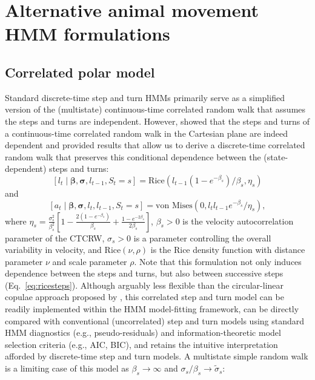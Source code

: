 \documentclass[12pt]{article}\usepackage[]{graphicx}\usepackage[]{xcolor}
\begin{document}
\section{Alternative animal movement HMM formulations}

\subsection{Correlated polar model}
Standard discrete-time step and turn HMMs primarily serve as a simplified version of the (multistate) continuous-time correlated random walk \citep[CTCRW, e.g.,][]{JohnsonEtAl2008,MichelotBlackwell2018} that assumes the steps and turns are independent. However, \citet{McClintockEtAl2014b} showed that the steps and turns of a continuous-time correlated random walk in the Cartesian plane are indeed dependent and provided results \citep[based on][Chapter 7]{kobayashi2011probability} that allow us to derive a discrete-time correlated random walk that preserves this conditional dependence between the (state-dependent) steps and turns:
\begin{equation}
\label{eq:ricesteps}
  [l_t \mid \boldsymbol{\beta}, \boldsymbol{\sigma}, l_{t-1}, S_t = s] = \text{Rice}\left(l_{t-1}\left(1-e^{-\beta_s}\right) / \beta_s, \eta_s \right)
\end{equation}
and
\begin{equation}
\label{eq:vmangles}
  [a_t \mid \boldsymbol{\beta}, \boldsymbol{\sigma}, l_t, l_{t-1}, S_t = s] = \text{von Mises}\left(0, l_t l_{t-1} e^{-\beta_s} / \eta_s \right),
\end{equation}
where $\eta_s = \frac{\sigma_s^2}{\beta_s^2} \left[1-\frac{2 \left(1-e^{-\beta_s}\right)}{\beta_s}+\frac{1-e^{-2\beta_s}}{2 \beta_s} \right]$, $\beta_s>0$ is the velocity autocorrelation parameter of the CTCRW, $\sigma_s>0$ is a parameter controlling the overall variability in velocity, and $\text{Rice}\left(\nu, \rho \right)$ is the Rice density function with distance parameter $\nu$ and scale parameter $\rho$. Note that this formulation not only induces dependence between the steps and turns, but also between successive steps (Eq.\ \ref{eq:ricesteps}). Although arguably less flexible than the circular-linear copulae approach proposed by \citet{hodel2022circular}, this correlated step and turn model can be readily implemented within the HMM model-fitting framework, can be directly compared with conventional (uncorrelated) step and turn models using standard HMM diagnostics (e.g., pseudo-residuals) and information-theoretic model selection criteria (e.g., AIC, BIC), and retains the intuitive interpretation afforded by discrete-time step and turn models. A multistate simple random walk is a limiting case of this model as $\beta_s \to \infty$ and  $\sigma_s/\beta_s \to \tilde{\sigma}_s$:
\end{document}
